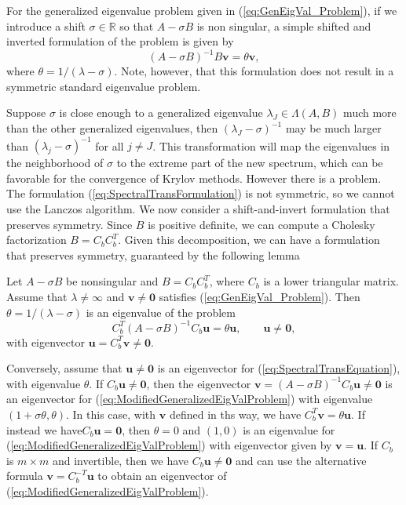 For the generalized eigenvalue problem given in (\ref{eq:GenEigVal_Problem}), if we introduce a shift $\sigma \in \mathbb{R}$ so that $A - \sigma B$ is non singular, a simple shifted and inverted formulation of the problem is given by
\begin{equation}\label{eq:SpectralTransFormulation}
	(A - \sigma B)^{-1} B\mathbf{v} = \theta \mathbf{v},
\end{equation}
where $\theta = 1 / (\lambda - \sigma)$.  Note, however, that this formulation does not result in a symmetric standard eigenvalue problem.

Suppose $\sigma$ is close enough to a generalized eigenvalue $\lambda_J \in \Lambda(A, B)$ much more than the other generalized eigenvalues, then $(\lambda_J - \sigma)^{-1}$ may be much larger than $(\lambda_j - \sigma)^{-1}$ for all $j \neq J$. This transformation will map the eigenvalues in the neighborhood of $\sigma$ to the extreme part of the new spectrum, which can be favorable for the convergence of Krylov methods.  However there is a problem.  The formulation (\ref{eq:SpectralTransFormulation}) is not symmetric, so we cannot use the Lanczos algorithm.  We now consider a shift-and-invert formulation that preserves symmetry. Since $B$ is positive definite, we can compute a Cholesky factorization $B = C_bC_b^T$. Given this decomposition, we can have a formulation that preserves symmetry, guaranteed by the following lemma
 \begin{lemma}\label{lemma:SpectralTransLemma}
 	Let $A-\sigma B$ be nonsingular and $B = C_bC_b^T$, where $C_b$ is a lower triangular matrix. Assume that $\lambda \neq \infty$ and $\mathbf{v} \neq \mathbf{0}$ satisfies (\ref{eq:GenEigVal_Problem}). Then $\theta = 1/(\lambda - \sigma)$  is an eigenvalue of the problem
 	\begin{equation}\label{eq:SpectralTransEquation}
 		C_b^T(A-\sigma B)^{-1}C_b \mathbf{u} = \theta \mathbf{u}, \qquad \mathbf{u} \neq \mathbf{0},
 	\end{equation}
 	with eigenvector $\mathbf{u} = C_b^T\mathbf{v} \neq \mathbf{0}$.
 	
 	Conversely, assume that $\mathbf{u} \neq \mathbf{0}$ is an eigenvector for (\ref{eq:SpectralTransEquation}), with eigenvalue $\theta$. If $C_b\mathbf{u} \neq \mathbf{0}$, then the eigenvector $\mathbf{v} = (A -\sigma B)^{-1}C_b\mathbf{u} \neq \mathbf{0}$ is an eigenvector for (\ref{eq:ModifiedGeneralizedEigValProblem}) with eigenvalue $(1+\sigma \theta, \theta)$. In this case, with $\mathbf{v}$ defined in ths way, we have $C_b^T\mathbf{v} = \theta \mathbf{u}$. If instead we have$C_b\mathbf{u} = \mathbf{0}$, then $\theta = 0$ and $(1, 0)$ is an eigenvalue for (\ref{eq:ModifiedGeneralizedEigValProblem}) with eigenvector given by $\mathbf{v} = \mathbf{u}$. If $C_b$ is $m \times m$ and invertible, then we have $C_b\mathbf{u} \neq \mathbf{0}$ and can use the alternative formula $\mathbf{v} = C_b^{-T}\mathbf{u}$ to obtain an eigenvector of (\ref{eq:ModifiedGeneralizedEigValProblem}).
 \end{lemma}
